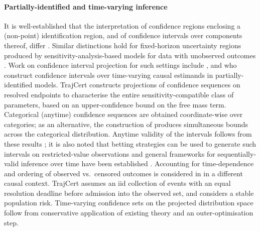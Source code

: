\paragraph{Partially-identified and time-varying inference} 
It is well-established that the interpretation of confidence regions enclosing a (non-point) identification region, and of confidence intervals over components thereof, differ \citep{imbens2004}. Similar distinctions hold for fixed-horizon uncertainty regions produced by sensitivity-analysis-based models for data with unobserved outcomes \citep{vansteelandt2006}. Work on confidence interval projection for such settings include \citet{kaido2019}, and \citet{dalal2024} who construct confidence intervals over time-varying causal estimands in partially-identified models. TrajCert constructs projections of confidence sequences on resolved endpoints to characterise the entire sensitivity-compatible class of parameters, based on an upper-confidence bound on the free mass term. Categorical (anytime) confidence sequences are obtained coordinate-wise over categories; as an alternative, the construction of \citet{lindon2022} produces simultaneous bounds across the categorical distribution. Anytime validity of the intervals follows from these results \citep{howard2021,ramdas2023}; it is also noted that betting strategies can be used to generate such intervals on restricted-value observations \citep{waudby2024} and general frameworks for sequentially-valid inference over time have been established \citep{johari2022}. Accounting for time-dependence and ordering of observed vs.\ censored outcomes is considered in \citep{lindon2026} in a different causal context. TrajCert assumes an iid collection of events with an equal resolution deadline before admission into the observed set, and considers a stable population risk. Time-varying confidence sets on the projected distribution space follow from conservative application of existing theory and an outer-optimisation step.